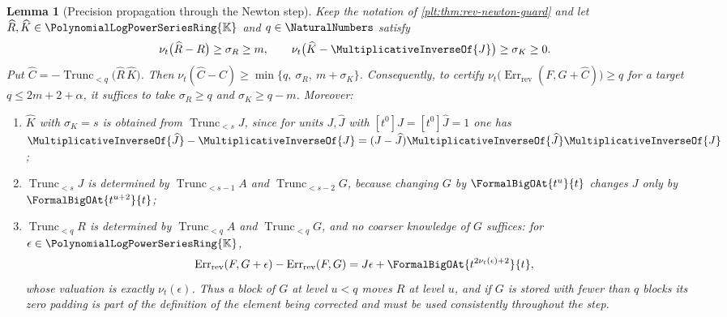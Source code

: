 \documentclass[11pt,oneside]{article}
\theoremstyle{plain}
\newtheorem{lemma}[theorem]{Lemma}
\theoremstyle{definition}
\theoremstyle{remark}
\newcommand{\K}{\mathbb{K}}
\newcommand{\PLpow}{\PolynomialLogPowerSeriesRing{\K}}   %
\newcommand{\ordt}{\nu_{t}}                              %
\newcommand{\Trunc}[2]{\operatorname{Trunc}_{<#2}#1}     %
\newcommand{\RevErr}[2]{\operatorname{Err}_{\mathrm{rev}}\!\left(#1,#2\right)}
\begin{document}
\begin{lemma}[Precision propagation through the Newton step]
\label{plt:lem:rev-precision-propagation}
Keep the notation of \cref{plt:thm:rev-newton-guard} and let
\(\widehat R,\widehat K\in\PLpow\) and \(q\in\NaturalNumbers\) satisfy
\[
 \ordt\bigl(\widehat R-R\bigr)\ge\sigma_R\ge m,
 \qquad
 \ordt\bigl(\widehat K-\MultiplicativeInverseOf{J}\bigr)\ge\sigma_K\ge0 .
\]
Put \(\widehat C=-\Trunc{\bigl(\widehat R\,\widehat K\bigr)}{q}\).  Then
\(\ordt(\widehat C-C)\ge\min\{q,\ \sigma_R,\ m+\sigma_K\}\).  Consequently, to
certify \(\ordt\bigl(\RevErr{F}{G+\widehat C}\bigr)\ge q\) for a target
\(q\le2m+2+\alpha\), it suffices to take \(\sigma_R\ge q\) and
\(\sigma_K\ge q-m\).  Moreover:
\begin{enumerate}
\item \(\widehat K\) with \(\sigma_K=s\) is obtained from \(\Trunc{J}{s}\),
since for units \(J,\widehat J\) with \([t^0]J=[t^0]\widehat J=1\) one has
\(\MultiplicativeInverseOf{\widehat J}-\MultiplicativeInverseOf{J}
=(J-\widehat J)\MultiplicativeInverseOf{\widehat J}\MultiplicativeInverseOf{J}\);
\item \(\Trunc{J}{s}\) is determined by \(\Trunc{A}{s-1}\) and
\(\Trunc{G}{s-2}\), because changing \(G\) by \(\FormalBigOAt{t^{u}}{t}\)
changes \(J\) only by \(\FormalBigOAt{t^{u+2}}{t}\);
\item \(\Trunc{R}{q}\) is determined by \(\Trunc{A}{q}\) and
\(\Trunc{G}{q}\), and no coarser knowledge of \(G\) suffices: for
\(\epsilon\in\PLpow\),
\[
 \RevErr{F}{G+\epsilon}-\RevErr{F}{G}
 =J\epsilon+\FormalBigOAt{t^{2\ordt(\epsilon)+2}}{t},
\]
whose valuation is exactly \(\ordt(\epsilon)\).  Thus a block of \(G\) at
level \(u<q\) moves \(R\) at level \(u\), and if \(G\) is stored with fewer
than \(q\) blocks its zero padding is part of the definition of the element
being corrected and must be used consistently throughout the step.
\end{enumerate}
\end{lemma}
\end{document}
